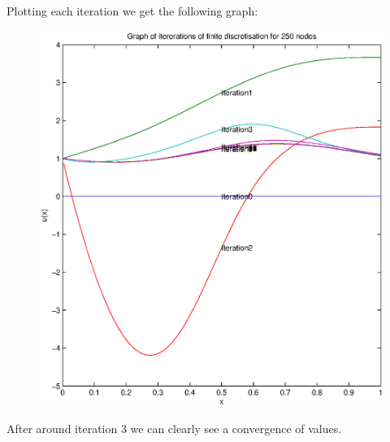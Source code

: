 \documentclass[fleqn]{report}
\begin{document}
\newpage
Plotting each iteration we get the following graph:
\begin{figure}[h!]
\begin{center}
    \centerline{\includegraphics[width=1.1\textwidth]{graphs/q5g1.eps}}
\end{center}
\end{figure}

After around iteration 3 we can clearly see a convergence of values.
\newpage
\end{document}
